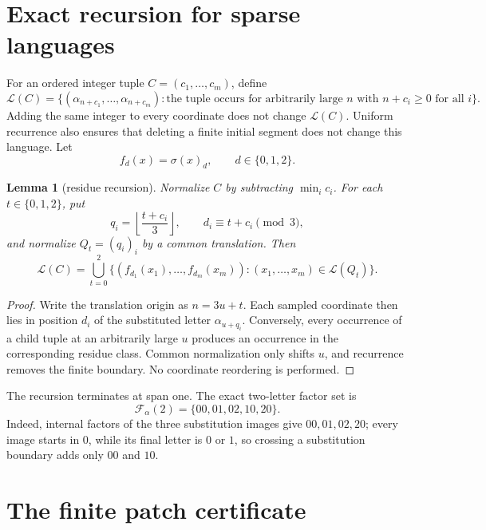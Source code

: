 \documentclass[11pt]{article}
\newtheorem{lemma}[theorem]{Lemma}
\newcommand{\Lang}{\mathcal L}
\begin{document}
\section{Exact recursion for sparse languages}\label{sec:recursion}

For an ordered integer tuple $C=(c_1,\ldots,c_m)$, define
\[
\Lang(C)=\{(\alpha_{n+c_1},\ldots,\alpha_{n+c_m}):
\text{the tuple occurs for arbitrarily large }n
\text{ with }n+c_i\ge0\text{ for all }i\}.
\]
Adding the same integer to every coordinate does not change $\Lang(C)$.
Uniform recurrence also ensures that deleting a finite initial segment does
not change this language. Let
\[
f_d(x)=\sigma(x)_d,\qquad d\in\{0,1,2\}.
\]

\begin{lemma}[residue recursion]\label{lem:recursion}
Normalize $C$ by subtracting $\min_i c_i$. For each
$t\in\{0,1,2\}$, put
\[
q_i=\left\lfloor\frac{t+c_i}{3}\right\rfloor,
\qquad d_i\equiv t+c_i\pmod3,
\]
and normalize $Q_t=(q_i)_i$ by a common translation. Then
\begin{equation}
\Lang(C)=\bigcup_{t=0}^2
\{(f_{d_1}(x_1),\ldots,f_{d_m}(x_m)):
(x_1,\ldots,x_m)\in\Lang(Q_t)\}.
\label{eq:recursion}
\end{equation}
\end{lemma}

\begin{proof}
Write the translation origin as $n=3u+t$. Each sampled coordinate then lies
in position $d_i$ of the substituted letter $\alpha_{u+q_i}$. Conversely,
every occurrence of a child tuple at an arbitrarily large $u$ produces an
occurrence in the corresponding residue class. Common normalization only
shifts $u$, and recurrence removes the finite boundary. No coordinate
reordering is performed.
\end{proof}

The recursion terminates at span one. The exact two-letter factor set is
\begin{equation}
\mathcal F_\alpha(2)=\{00,01,02,10,20\}.
\label{eq:pairs}
\end{equation}
Indeed, internal factors of the three substitution images give
$00,01,02,20$; every image starts in $0$, while its final letter is $0$ or
$1$, so crossing a substitution boundary adds only $00$ and $10$.

\section{The finite patch certificate}\label{sec:certificate}
\end{document}

